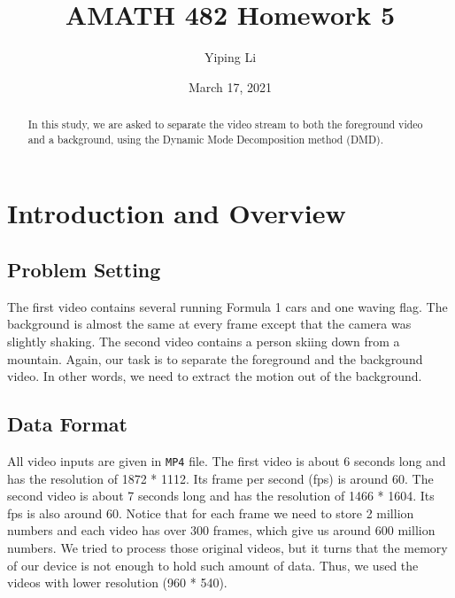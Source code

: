 \documentclass{article}
\title{AMATH 482 Homework 5}
\author{Yiping Li}
\date{March 17, 2021}
\begin{document}
\maketitle

\begin{abstract}
    In this study, we are asked to separate the video stream to both the foreground video and a background, using the Dynamic Mode Decomposition method (DMD).
\end{abstract}

\section{Introduction and Overview}
\subsection{Problem Setting}
The first video contains several running Formula 1 cars and one waving flag. The background is almost the same at every frame except that the camera was slightly shaking. The second video contains a person skiing down from a mountain. Again, our task is to separate the foreground and the background video. In other words, we need to extract the motion out of the background.
\subsection{Data Format}
All video inputs are given in \texttt{MP4} file. The first video is about 6 seconds long and has the resolution of 1872 * 1112. Its frame per second (fps) is around 60. The second video is about 7 seconds long and has the resolution of 1466 * 1604. Its fps is also around 60. Notice that for each frame we need to store 2 million numbers and each video has over 300 frames, which give us around 600 million numbers. We tried to process those original videos, but it turns that the memory of our device is not enough to hold such amount of data. Thus, we used the videos with lower resolution (960 * 540).
\end{document}
